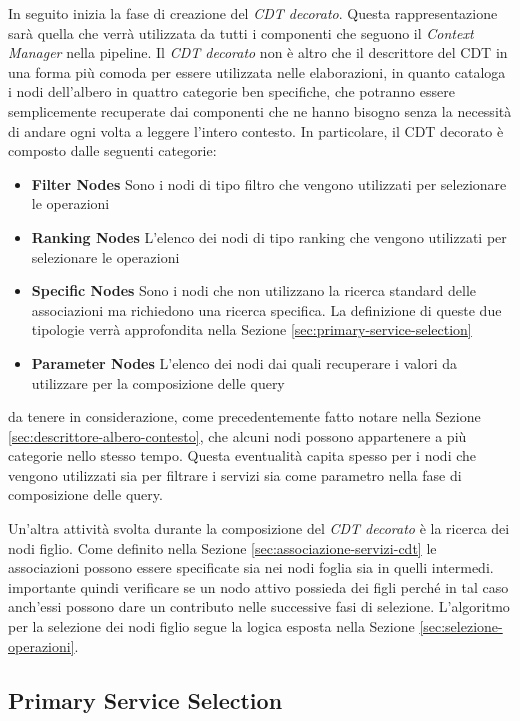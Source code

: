 In seguito inizia la fase di creazione del \emph{CDT decorato}. Questa rappresentazione sarà quella che verrà utilizzata da tutti i componenti che seguono il \emph{Context Manager} nella pipeline. Il \emph{CDT decorato} non è altro che il descrittore del CDT in una forma più comoda per essere utilizzata nelle elaborazioni, in quanto cataloga i nodi dell'albero in quattro categorie ben specifiche, che potranno essere semplicemente recuperate dai componenti che ne hanno bisogno senza la necessità di andare ogni volta a leggere l'intero contesto. In particolare, il CDT decorato è composto dalle seguenti categorie:

\begin{itemize}
	\item \textbf{Filter Nodes}
	Sono i nodi di tipo filtro che vengono utilizzati per selezionare le operazioni
	\item \textbf{Ranking Nodes}
	L'elenco dei nodi di tipo ranking che vengono utilizzati per selezionare le operazioni
	\item \textbf{Specific Nodes}
	Sono i nodi che non utilizzano la ricerca standard delle associazioni ma richiedono una ricerca specifica. La definizione di queste due tipologie verrà approfondita nella Sezione \ref{sec:primary-service-selection}
	\item \textbf{Parameter Nodes}
	L'elenco dei nodi dai quali recuperare i valori da utilizzare per la composizione delle query
\end{itemize}

\upe da tenere in considerazione, come precedentemente fatto notare nella Sezione \ref{sec:descrittore-albero-contesto}, che alcuni nodi possono appartenere a più categorie nello stesso tempo. Questa eventualità capita spesso per i nodi che vengono utilizzati sia per filtrare i servizi sia come parametro nella fase di composizione delle query.

Un'altra attività svolta durante la composizione del \emph{CDT decorato} è la ricerca dei nodi figlio. Come definito nella Sezione \ref{sec:associazione-servizi-cdt} le associazioni possono essere specificate sia nei nodi foglia sia in quelli intermedi. \upe importante quindi verificare se un nodo attivo possieda dei figli perché in tal caso anch'essi possono dare un contributo nelle successive fasi di selezione. L'algoritmo per la selezione dei nodi figlio segue la logica esposta nella Sezione \ref{sec:selezione-operazioni}.

\subsection{Primary Service Selection\label{sec:primary-service-selection}}

